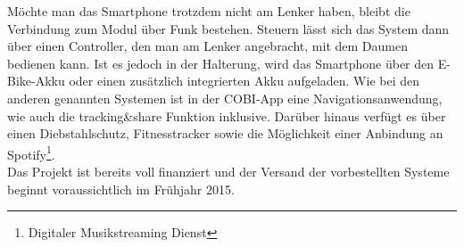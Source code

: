 Möchte man das \gls{Smartphone} trotzdem nicht am Lenker haben, bleibt die Verbindung zum Modul über Funk bestehen. Steuern lässt sich das System dann über einen Controller, den man am Lenker angebracht, mit dem Daumen bedienen kann. Ist es jedoch in der Halterung, wird das \gls{Smartphone} über den E-Bike-Akku oder einen zusätzlich integrierten Akku aufgeladen. Wie bei den anderen genannten Systemen ist in der \textsc{COBI}-\Gls{App} eine Navigationsanwendung, wie auch die tracking\&share Funktion inklusive. Darüber hinaus verfügt es über einen Diebstahlschutz, Fitnesstracker sowie die Möglichkeit einer Anbindung an Spotify\footnote{ Digitaler Musikstreaming Dienst}.\\
Das Projekt ist bereits voll finanziert und der Versand der vorbestellten Systeme beginnt voraussichtlich im Frühjahr 2015. \cite{cobi}
